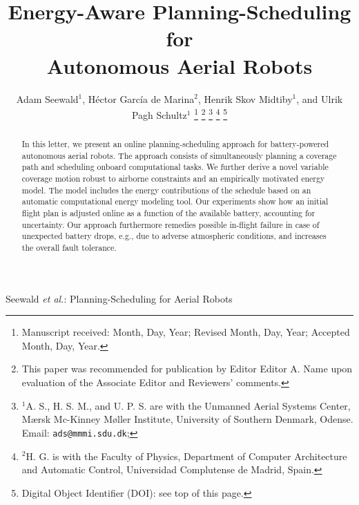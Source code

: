 \documentclass[letterpaper,10pt,journal,twoside]{IEEEtran}
\theoremstyle{definition}
\begin{document}
\title{Energy-Aware Planning-Scheduling for\\Autonomous Aerial Robots}

\author{
  Adam Seewald$^{\text{1}}$, H\'ector Garc\'ia de Marina$^{\text{2}}$, Henrik Skov Midtiby$^{\text{1}}$, and Ulrik Pagh Schultz$^{\text{1}}$
  \thanks{Manuscript received: Month, Day, Year; Revised Month, Day, Year; Accepted Month, Day, Year.}%
  \thanks{This paper was recommended for publication by Editor Editor A. Name upon evaluation of the Associate Editor and Reviewers' comments.} %
  \thanks{$^{\text{1}}$A. S., H. S. M.,  and U. P. S. are with the Unmanned Aerial Systems Center, M{\ae}rsk Mc-Kinney M{\o}ller Institute, University of Southern Denmark, Odense. Email: {\tt\footnotesize ads@mmmi.sdu.dk};} 
  \thanks{$^{\text{2}}$H. G. is with the Faculty of Physics, Department of Computer Architecture and Automatic Control, Universidad Complutense de Madrid, Spain.}
  \thanks{Digital Object Identifier (DOI): see top of this page.}
}

{Seewald \MakeLowercase{\textit{et al.}}: Planning-Scheduling for Aerial Robots} 

\maketitle

\vspace*{-4.6ex}

\begin{abstract}
  In this letter, we present an online planning-scheduling approach for battery-powered autonomous aerial robots. The approach consists of simultaneously planning a coverage path and scheduling onboard computational tasks. We further derive a novel variable coverage motion robust to airborne constraints and an empirically motivated energy model. The model includes the energy contributions of the schedule based on an automatic computational energy modeling tool. Our experiments show how an initial flight plan is adjusted online as a function of the available battery, accounting for uncertainty. Our approach furthermore remedies possible in-flight failure in case of unexpected battery drops, e.g., due to adverse atmospheric conditions, and increases the overall fault tolerance.
\end{abstract}
\end{document}

